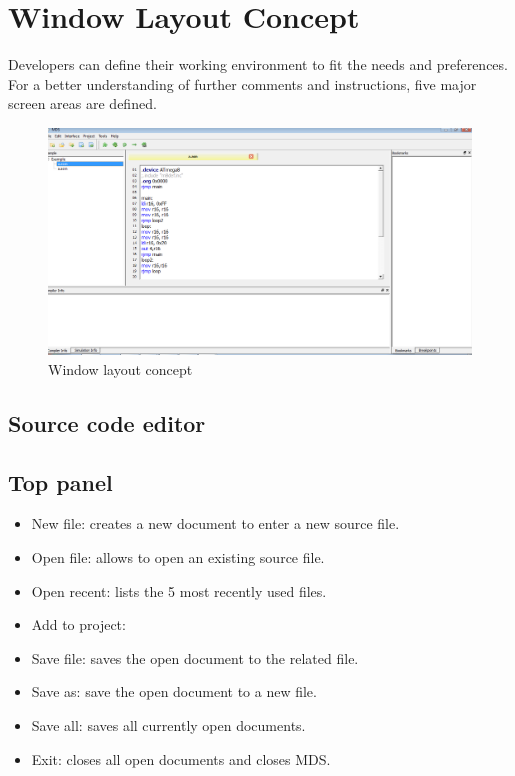 \section{Window Layout Concept}
    Developers can define their working environment to fit the needs and preferences. For a better understanding of further comments and instructions, five major screen areas are defined. %
    \begin{figure}[h]
        \centering
        \includegraphics[width=.9\textwidth]{img/Demonstration_project.png}
        \caption{Window layout concept}
    \end{figure}

\subsection{Source code editor}

\subsection{Top panel}
    \begin{itemize}
        \item New file: creates a new document to enter a new source file.
        \item Open file: allows to open an existing source file.
        \item Open recent: lists the 5 most recently used files.
        \item Add to project:
        \item Save file: saves the open document to the related file.
        \item Save as: save the open document to a new file.
        \item Save all: saves all currently open documents.
        \item Exit: closes all open documents and closes MDS.
    \end{itemize}

